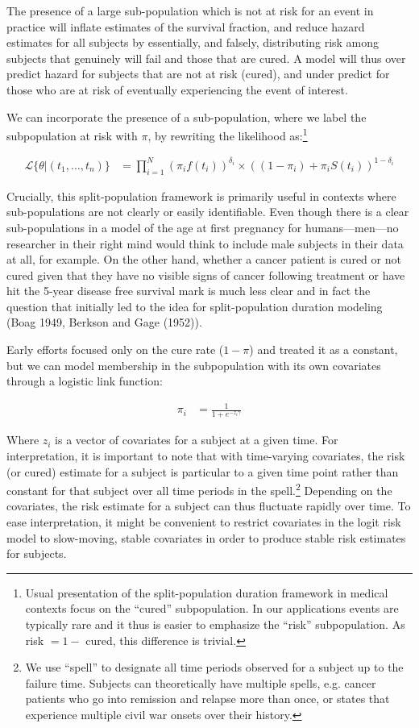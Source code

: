 \documentclass[]{article}
\let\rmarkdownfootnote\footnote%
\def\footnote{\protect\rmarkdownfootnote}
\begin{document}
The presence of a large sub-population which is not at risk for an event
in practice will inflate estimates of the survival fraction, and reduce
hazard estimates for all subjects by essentially, and falsely,
distributing risk among subjects that genuinely will fail and those that
are cured. A model will thus over predict hazard for subjects that are
not at risk (cured), and under predict for those who are at risk of
eventually experiencing the event of interest.

We can incorporate the presence of a sub-population, where we label the
subpopulation at risk with \(\pi\), by rewriting the likelihood
as:\footnote{Usual presentation of the split-population duration framework in medical contexts focus on the ``cured'' subpopulation. In our applications events are typically rare and it thus is easier to emphasize the ``risk'' subpopulation. As risk $= 1 - $ cured, this difference is trivial.}

\begin{align}
\mathcal{L}\{\theta|(t_{1}, \dots, t_{n})\} &= \prod_{i=1}^{N} \left(\pi_i f(t_i)\right)^{\delta_i} \times  \left((1-\pi_i) + \pi_i S(t_i)\right)^{1-\delta_i}
\end{align}

Crucially, this split-population framework is primarily useful in
contexts where sub-populations are not clearly or easily identifiable.
Even though there is a clear sub-populations in a model of the age at
first pregnancy for humans---men---no researcher in their right mind
would think to include male subjects in their data at all, for example.
On the other hand, whether a cancer patient is cured or not cured given
that they have no visible signs of cancer following treatment or have
hit the 5-year disease free survival mark is much less clear and in fact
the question that initially led to the idea for split-population
duration modeling (Boag 1949, Berkson and Gage (1952)).

Early efforts focused only on the cure rate (\(1 - \pi\)) and treated it
as a constant, but we can model membership in the subpopulation with its
own covariates through a logistic link function:

\begin{align}
\pi_i &= \frac{1}{1 + e^{-z_i \gamma}}
\end{align}

Where \(z_i\) is a vector of covariates for a subject at a given time.
For interpretation, it is important to note that with time-varying
covariates, the risk (or cured) estimate for a subject is particular to
a given time point rather than constant for that subject over all time
periods in the
spell.\footnote{We use ``spell'' to designate all time periods observed for a subject up to the failure time. Subjects can theoretically have multiple spells, e.g. cancer patients who go into remission and relapse more than once, or states that experience multiple civil war onsets over their history.}
Depending on the covariates, the risk estimate for a subject can thus
fluctuate rapidly over time. To ease interpretation, it might be
convenient to restrict covariates in the logit risk model to
slow-moving, stable covariates in order to produce stable risk estimates
for subjects.
\end{document}
